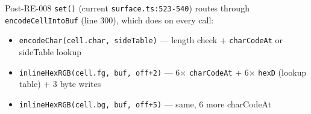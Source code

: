 Post-RE-008 \texttt{s\allowbreak{}e\allowbreak{}t\allowbreak{}(\allowbreak{})} (current \texttt{s\allowbreak{}u\allowbreak{}r\allowbreak{}f\allowbreak{}a\allowbreak{}c\allowbreak{}e\allowbreak{}.\allowbreak{}t\allowbreak{}s\allowbreak{}:\allowbreak{}5\allowbreak{}2\allowbreak{}3\allowbreak{}-\allowbreak{}5\allowbreak{}4\allowbreak{}0}) routes through \texttt{e\allowbreak{}n\allowbreak{}c\allowbreak{}o\allowbreak{}d\allowbreak{}e\allowbreak{}C\allowbreak{}e\allowbreak{}l\allowbreak{}l\allowbreak{}I\allowbreak{}n\allowbreak{}t\allowbreak{}o\allowbreak{}B\allowbreak{}u\allowbreak{}f} (line 300), which does on every call:

\begin{itemize}
\tightlist
\item
  \texttt{e\allowbreak{}n\allowbreak{}c\allowbreak{}o\allowbreak{}d\allowbreak{}e\allowbreak{}C\allowbreak{}h\allowbreak{}a\allowbreak{}r\allowbreak{}(\allowbreak{}c\allowbreak{}e\allowbreak{}l\allowbreak{}l\allowbreak{}.\allowbreak{}c\allowbreak{}h\allowbreak{}a\allowbreak{}r\allowbreak{},\allowbreak{} \allowbreak{}s\allowbreak{}i\allowbreak{}d\allowbreak{}e\allowbreak{}T\allowbreak{}a\allowbreak{}b\allowbreak{}l\allowbreak{}e\allowbreak{})} --- length check + \texttt{c\allowbreak{}h\allowbreak{}a\allowbreak{}r\allowbreak{}C\allowbreak{}o\allowbreak{}d\allowbreak{}e\allowbreak{}A\allowbreak{}t} or sideTable lookup
\item
  \texttt{i\allowbreak{}n\allowbreak{}l\allowbreak{}i\allowbreak{}n\allowbreak{}e\allowbreak{}H\allowbreak{}e\allowbreak{}x\allowbreak{}R\allowbreak{}G\allowbreak{}B\allowbreak{}(\allowbreak{}c\allowbreak{}e\allowbreak{}l\allowbreak{}l\allowbreak{}.\allowbreak{}f\allowbreak{}g\allowbreak{},\allowbreak{} \allowbreak{}b\allowbreak{}u\allowbreak{}f\allowbreak{},\allowbreak{} \allowbreak{}o\allowbreak{}f\allowbreak{}f\allowbreak{}+\allowbreak{}2\allowbreak{})} --- 6× \texttt{c\allowbreak{}h\allowbreak{}a\allowbreak{}r\allowbreak{}C\allowbreak{}o\allowbreak{}d\allowbreak{}e\allowbreak{}A\allowbreak{}t} + 6× \texttt{h\allowbreak{}e\allowbreak{}x\allowbreak{}D} (lookup table) + 3 byte writes
\item
  \texttt{i\allowbreak{}n\allowbreak{}l\allowbreak{}i\allowbreak{}n\allowbreak{}e\allowbreak{}H\allowbreak{}e\allowbreak{}x\allowbreak{}R\allowbreak{}G\allowbreak{}B\allowbreak{}(\allowbreak{}c\allowbreak{}e\allowbreak{}l\allowbreak{}l\allowbreak{}.\allowbreak{}b\allowbreak{}g\allowbreak{},\allowbreak{} \allowbreak{}b\allowbreak{}u\allowbreak{}f\allowbreak{},\allowbreak{} \allowbreak{}o\allowbreak{}f\allowbreak{}f\allowbreak{}+\allowbreak{}5\allowbreak{})} --- same, 6 more charCodeAt

\end{itemize}

